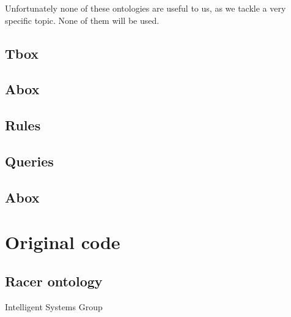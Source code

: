 \documentclass[a4paper,12pt]{report}
\begin{document}
Unfortunately none of these ontologies are useful to us, as we tackle a very specific topic. None of them will be used.


\clearpage
\section{Tbox}


\clearpage
\section{Abox}


\clearpage
\section{Rules}


\clearpage
\section{Queries}


\clearpage
\section{Abox}


\clearpage
\appendix

\chapter{Original code}
\section{Racer ontology}


\printbibliography

\vspace{2cm}
\begin{center}
Intelligent Systems Group\\
\end{center}
\end{document}
